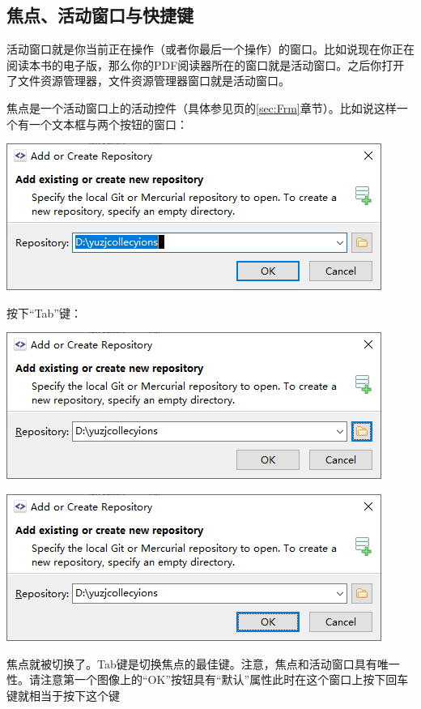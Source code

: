 \subsection{焦点、活动窗口与快捷键}
活动窗口就是你当前正在操作（或者你最后一个操作）的窗口。比如说现在你正在阅读本书的电子版，那么你的PDF阅读器所在的窗口就是活动窗口。之后你打开了文件资源管理器，文件资源管理器窗口就是活动窗口。\par
焦点是一个活动窗口上的活动控件（具体参见\pageref{sec:Frm}页的\ref{sec:Frm}章节）。比如说这样一个有一个文本框与两个按钮的窗口：\par
\begin{center}
	\includegraphics[width=0.7\linewidth]{pic/forcus1}
\end{center} \par
按下“Tab”键：\par
\begin{center}
	\includegraphics[width=0.7\linewidth]{pic/forcus2}
\end{center} \par
\begin{center}
	\includegraphics[width=0.7\linewidth]{pic/forcus3}
\end{center} \par
焦点就被切换了。Tab键是切换焦点的最佳键。注意，焦点和活动窗口具有唯一性。请注意第一个图像上的“OK”按钮具有“默认”属性此时在这个窗口上按下回车键就相当于按下这个键\par
